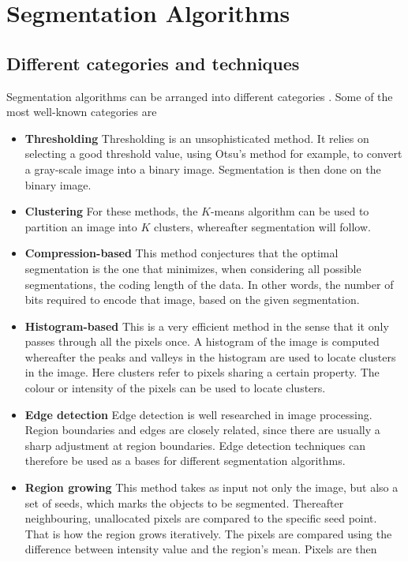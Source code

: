 \documentclass[a4paper,10pt]{article}
\begin{document}
\newpage
\section{Segmentation Algorithms}
\subsection{Different categories and techniques}
Segmentation algorithms can be arranged into different categories \cite{is}. 
Some of the most well-known categories are
\begin{itemize}
 \item \textbf{Thresholding}  Thresholding is an unsophisticated method. It
relies on
     selecting a good threshold
     value, using Otsu's method for example, to convert a gray-scale image into
a binary image.  Segmentation is
     then done on the binary image. 
 \item \textbf{Clustering} For these methods, the $K$-means algorithm
can be used to partition an image into $K$ clusters, whereafter
segmentation will follow.
 \item \textbf{Compression-based} This method conjectures that the
optimal segmentation is the one that minimizes, when considering all possible
segmentations, the coding length of the data. In other words, the number of bits
required to encode that image, based on the given segmentation.
 \item \textbf{Histogram-based}  This is a very efficient method in the
sense that it only passes through all the pixels once.  A histogram of 
the image is computed whereafter the peaks and valleys in the histogram
are used to locate clusters in the image.  Here clusters refer to pixels
sharing a certain property.  The colour or intensity of the pixels can be used
to
locate clusters.
 \item \textbf{Edge detection} Edge detection is well researched in image
processing.  Region boundaries and edges are closely related,
since there are usually a sharp adjustment at region boundaries.  Edge detection
techniques can therefore be used as a bases for different segmentation
algorithms.
 \item \textbf{Region growing} This method takes as input not only
the image, but also a set of seeds, which marks the objects to be segmented. 
Thereafter neighbouring, unallocated pixels are compared to the specific seed
point.  That is how the region grows iteratively.  The pixels are compared using
the difference between intensity value and the region's mean.  Pixels are then

\end{itemize}
\end{document}
